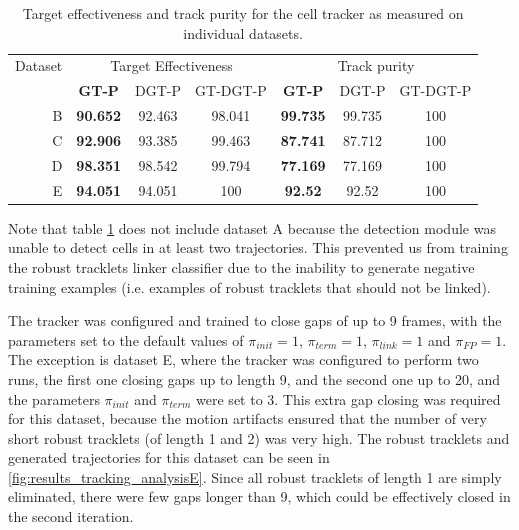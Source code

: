 		\begin{table}[h]
			\centering
			\begin{tabular}{r*{3}{c}*{3}{c}}
				Dataset & \multicolumn{3}{c}{Target Effectiveness} &  \multicolumn{3}{c}{Track purity}   \\
				        &  \textbf{GT-P}  & DGT-P  &   GT-DGT-P    &  \textbf{GT-P}  & DGT-P  & GT-DGT-P \\
			\hline
				      B & \textbf{90.652} & 92.463 &    98.041     & \textbf{99.735} & 99.735 &   100    \\
				      C & \textbf{92.906} & 93.385 &    99.463     & \textbf{87.741} & 87.712 &   100    \\
				      D & \textbf{98.351} & 98.542 &    99.794     & \textbf{77.169} & 77.169 &   100    \\
				      E & \textbf{94.051} & 94.051 &      100      & \textbf{ 92.52} & 92.52  &   100
			\end{tabular} 
			\caption{Target effectiveness and track purity for the cell tracker as measured on individual datasets.}
			\label{tab:results_tracker_individual}
		\end{table}
		
		Note that table \cref{tab:results_tracker_individual} does not include dataset A because the detection module was unable to detect cells in at least two trajectories. This prevented us from training the robust tracklets linker classifier due to the inability to generate negative training examples (i.e. examples of robust tracklets that should not be linked).
		
		The tracker was configured and trained to close gaps of up to 9 frames, with the parameters set to the default values of $\pi_{init}=1$, $\pi_{term}=1$, $\pi_{link}=1$ and $\pi_{FP}=1$. The exception is dataset E, where the tracker was configured to perform two runs, the first one closing gaps up to length 9, and the second one up to 20, and the parameters $\pi_{init}$ and $\pi_{term}$ were set to 3. This extra gap closing was required for this dataset, because the motion artifacts ensured that the number of very short robust tracklets (of length 1 and 2) was very high. The robust tracklets and generated trajectories for this dataset can be seen in \cref{fig:results_tracking_analysisE}. Since all robust tracklets of length 1 are simply eliminated, there were few gaps longer than 9, which could be effectively closed in the second iteration.
		
